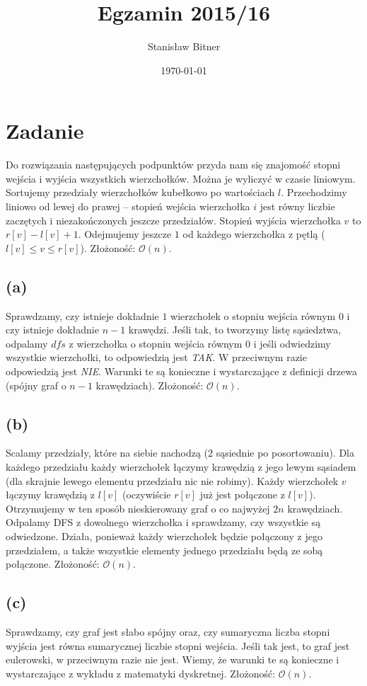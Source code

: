 \documentclass[12pt, a4paper]{article}
\title{Egzamin 2015/16}
\author{Stanisław Bitner}
\date{\today}
\newcommand{\MCALO}{\mathcal{O}}
\newcounter{zadanie}
\newcommand{\zadanie}{\addtocounter{zadanie}{1}\section*{Zadanie \arabic{zadanie}}}
\begin{document}
\maketitle
\zadanie{}

Do rozwiązania następujących podpunktów przyda nam się znajomość stopni wejścia
i wyjścia wszystkich wierzchołków. Można je wyliczyć w czasie liniowym.
Sortujemy przedziały wierzchołków kubełkowo po wartościach $l$. Przechodzimy
liniowo od lewej do prawej -- stopień wejścia wierzchołka $i$ jest równy
liczbie zaczętych i niezakończonych jeszcze przedziałów. Stopień wyjścia
wierzchołka $v$ to $r[v] - l[v] + 1$. Odejmujemy jeszcze $1$ od każdego
wierzchołka z pętlą ($l[v] \le v \le r[v]$).
Złożoność: $\MCALO(n)$.

\subsection*{(a)}
Sprawdzamy, czy istnieje dokładnie $1$ wierzchołek o stopniu wejścia równym $0$
i czy istnieje dokładnie $n-1$ krawędzi. Jeśli tak, to tworzymy listę
sąsiedztwa, odpalamy $dfs$ z wierzchołka o stopniu wejścia równym $0$ i jeśli
odwiedzimy wszystkie wierzchołki, to odpowiedzią jest \textit{TAK}.
W przeciwnym razie odpowiedzią jest \textit{NIE}. Warunki te są konieczne
i wystarczające z definicji drzewa (spójny graf o $n-1$ krawędziach).
Złożoność: $\MCALO(n)$.

\subsection*{(b)}
Scalamy przedziały, które na siebie nachodzą ($2$ sąsiednie po posortowaniu).
Dla każdego przedziału każdy wierzchołek łączymy krawędzią z jego lewym
sąsiadem (dla skrajnie lewego elementu przedziału nic nie robimy). Każdy
wierzchołek $v$ łączymy krawędzią z $l[v]$ (oczywiście $r[v]$ już jest
połączone z $l[v]$). Otrzymujemy w ten sposób nieskierowany graf o co najwyżej
$2n$ krawędziach. Odpalamy DFS z dowolnego wierzchołka i sprawdzamy, czy
wszystkie są odwiedzone. Działa, ponieważ każdy wierzchołek będzie połączony
z jego przedziałem, a także wszystkie elementy jednego przedziału będą ze sobą
połączone.
Złożoność: $\MCALO(n)$.

\subsection*{(c)}
Sprawdzamy, czy graf jest słabo spójny oraz, czy sumaryczna liczba stopni
wyjścia jest równa sumarycznej liczbie stopni wejścia. Jeśli tak jest, to graf
jest eulerowski, w przeciwnym razie nie jest. Wiemy, że warunki te są konieczne
i wystarczające z wykładu z matematyki dyskretnej.
Złożoność: $\MCALO(n)$.
\end{document}
